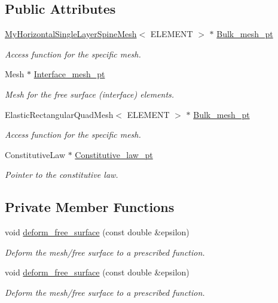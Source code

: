 \subsection*{Public Attributes}
\begin{DoxyCompactItemize}
\item 
\hyperlink{classoomph_1_1MyHorizontalSingleLayerSpineMesh}{My\+Horizontal\+Single\+Layer\+Spine\+Mesh}$<$ E\+L\+E\+M\+E\+NT $>$ $\ast$ \hyperlink{classInterfaceProblem_a6df8c17d561715be1e6e7badfe339122}{Bulk\+\_\+mesh\+\_\+pt}
\begin{DoxyCompactList}\small\item\em Access function for the specific mesh. \end{DoxyCompactList}\item 
Mesh $\ast$ \hyperlink{classInterfaceProblem_afd6b076362ccdb4ade0450fa3d3bf1ac}{Interface\+\_\+mesh\+\_\+pt}
\begin{DoxyCompactList}\small\item\em Mesh for the free surface (interface) elements. \end{DoxyCompactList}\item 
Elastic\+Rectangular\+Quad\+Mesh$<$ E\+L\+E\+M\+E\+NT $>$ $\ast$ \hyperlink{classInterfaceProblem_af580057bd9cc1d05a67401c9e5e178c2}{Bulk\+\_\+mesh\+\_\+pt}
\begin{DoxyCompactList}\small\item\em Access function for the specific mesh. \end{DoxyCompactList}\item 
Constitutive\+Law $\ast$ \hyperlink{classInterfaceProblem_a5bf645cbdbf7775ab6438be324caf3c3}{Constitutive\+\_\+law\+\_\+pt}
\begin{DoxyCompactList}\small\item\em Pointer to the constitutive law. \end{DoxyCompactList}\end{DoxyCompactItemize}
\subsection*{Private Member Functions}
\begin{DoxyCompactItemize}
\item 
void \hyperlink{classInterfaceProblem_a4514af9aa19dd50d10ca18f12039428f}{deform\+\_\+free\+\_\+surface} (const double \&epsilon)
\begin{DoxyCompactList}\small\item\em Deform the mesh/free surface to a prescribed function. \end{DoxyCompactList}\item 
void \hyperlink{classInterfaceProblem_a4514af9aa19dd50d10ca18f12039428f}{deform\+\_\+free\+\_\+surface} (const double \&epsilon)
\begin{DoxyCompactList}\small\item\em Deform the mesh/free surface to a prescribed function. \end{DoxyCompactList}\end{DoxyCompactItemize}
